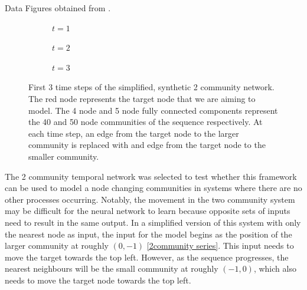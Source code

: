 \documentclass[12pt]{amsart}
\begin{document}
\begin{section}{Data}
        Figures obtained from \cite{Emma2023}.
        \begin{figure}[H]
            \centering
            \centering
            \begin{subfigure}[c]{0.3\textwidth}
                \centering
                \resizebox{.6\width}{!}{}
                \caption{$t=1$}
                \label{2community train series, a}
            \end{subfigure}
            \hfill
            \centering
            \begin{subfigure}[c]{0.3\textwidth}
                \centering
                \resizebox{.6\width}{!}{}
                \caption{$t=2$}
                \label{2community train series, b}
            \end{subfigure}
            \hfill
            \centering
            \begin{subfigure}[c]{0.3\textwidth}
                \centering
                \resizebox{.6\width}{!}{}
                \caption{$t=3$}
                \label{2community train series, c}
            \end{subfigure}
            \caption{First 3 time steps of the simplified, synthetic 2 community network. The red node represents the target node that we are aiming to model. The 4 node and 5 node fully connected components represent the 40 and 50 node communities of the sequence respectively. At each time step, an edge from the target node to the larger community is replaced with and edge from the target node to the smaller community.}
            \label{2community train series}
        \end{figure}
        The 2 community temporal network was selected to test whether this framework can be used to model a node changing communities in systems where there are no other processes occurring. Notably, the movement in the two community system may be difficult for the neural network to learn because opposite sets of inputs need to result in the same output. In a simplified version of this system with only the nearest node as input, the input for the model begins as the position of the larger community at roughly $(0,-1)$ \autoref{2community series}. This input needs to move the target towards the top left. However, as the sequence progresses, the nearest neighbours will be the small community at roughly $(-1,0)$, which also needs to move the target node towards the top left. 


\end{section}
\end{document}
